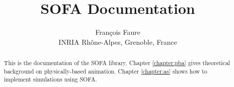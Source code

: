 \documentclass[a4paper,11pt]{report}
\title{SOFA Documentation}
\author{Fran\c{c}ois Faure\\ {\small INRIA Rh\^one-Alpes, Grenoble, France}}
\newcommand{\sofa}{SOFA}
\begin{document}
 
\maketitle

\begin{abstract}
This is the documentation of the SOFA library. Chapter \ref{chapter:pba} gives theoretical background on physically-based animation. Chapter \ref{chapter:as} shows how to implement simulations using \sofa.
\end{abstract}








\end{document}
